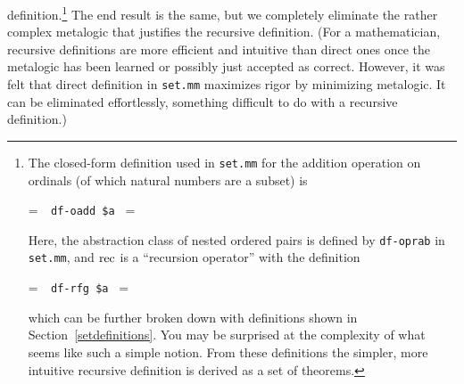 definition.\footnote{The closed-form definition used in \texttt{set.mm}
for the addition operation on ordinals (of which natural numbers are a
subset) is

\setbox\startprefix=\hbox{\tt \ \ df-oadd\ \$a\ }
\setbox\contprefix=\hbox{\tt \ \ \ \ \ \ \ \ \ \ \ \ \ }
\startm
\m{\vdash}\m{=}\m{\{}\m{\langle}\m{\langle}\m{,}\m{\rangle}%
\m{,}\m{\rangle}\m{|}\m{(}\m{(}\m{\in}\m{\wedge}\m{%
\in}\m{)}\m{\wedge}\m{=}\m{(}\m{(}\m{\{}\m{%
\langle}\m{,}\m{\rangle}\m{|}\m{=}\m{\}}\m{,}%
\m{)}\m{)}\m{)}\m{\}}
\endm

\noindent Here, the abstraction class of nested ordered pairs is defined by \texttt{df-oprab} in \texttt{set.mm},
and ${\rm rec}$ is a ``recursion operator'' with
the definition

\setbox\startprefix=\hbox{\tt \ \ df-rfg\ \$a\ }
\setbox\contprefix=\hbox{\tt \ \ \ \ \ \ \ \ \ \ \ \ }
\startm
\m{\vdash}\m{(}\m{,}\m{)}\m{=}\m{\bigcup}\m{\{}%
\m{|}\m{\exists}\m{(}\m{\in}\m{\wedge}\m{(}\m{\wedge}\m{\forall}\m{(}\m{\in}\m{\rightarrow}%
\m{(}\m{)}\m{=}\m{(}\m{\{}\m{\langle}\m{,}\m{\rangle}%
\m{|}\m{(}\m{(}\m{=}\m{\varnothing}\m{\wedge}\m{=}\m{)}\m{\vee}%
\m{(}\m{\lnot}\m{(}\m{=}\m{\varnothing}\m{\vee}%
\m{)}\m{\wedge}\m{=}\m{(}\m{(}\m{\bigcup}\m{)}\m{)}\m{)}\m{\vee}\m{(}\m{%
\wedge}\m{=}\m{\bigcup}\m{)}\m{)}\m{\}}\m{(}%
\m{\restriction}\m{)}\m{)}\m{)}\m{)}\m{)}\m{\}}
\endm

\noindent which can be further broken down with definitions shown in
Section~\ref{setdefinitions}.  You may be surprised at the complexity of what
seems like such a simple notion.  From these definitions the simpler, more
intuitive recursive definition is derived as a set of theorems.}
The end result is the same, but we completely eliminate the rather complex
metalogic that justifies the recursive definition.  (For a mathematician,
recursive definitions are more efficient and intuitive than
direct ones once the metalogic has been learned or possibly just accepted as
correct.  However, it was felt that direct definition in \texttt{set.mm}
maximizes rigor by minimizing metalogic.  It can be eliminated effortlessly,
something difficult to do with a recursive definition.)

